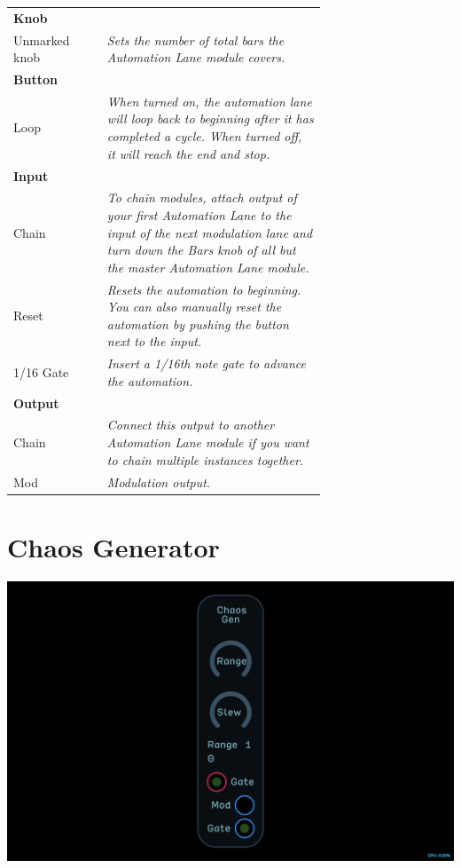 \documentclass[11pt]{book}
\begin{document}
\begin{table}[ht]
\small
\sffamily
\renewcommand\arraystretch{1.5}
\centering
\begin{tabular}{l*{1}{>{\raggedright\arraybackslash}p{0.7\linewidth}}}

\toprule
\textbf{Knob} \\
Unmarked knob & \textit{Sets the number of total bars the Automation Lane module covers.} \\

\midrule
\textbf{Button} \\
Loop & \textit{When turned on, the automation lane will loop back to beginning after it has completed a cycle. When turned off, it will reach the end and stop.} \\

\midrule
\textbf{Input} \\
Chain & \textit{To chain modules, attach output of your first Automation Lane to the input of the next modulation lane and turn down the Bars knob of all but the master Automation Lane module.} \\
Reset & \textit{Resets the automation to beginning. You can also manually reset the automation by pushing the button next to the input.} \\
1/16 Gate & \textit{Insert a 1/16th note gate to advance the automation.} \\

\midrule
\textbf{Output} \\
Chain & \textit{Connect this output to another Automation Lane module if you want to chain multiple instances together.} \\
Mod & \textit{Modulation output.} \\

\bottomrule
\end{tabular}
\end{table}%

\pagebreak


\section{Chaos Generator}

\includegraphics[width=\textwidth]{chaos-generator.png}
\end{document}

